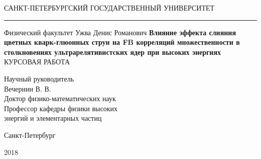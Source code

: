 \begin{titlepage} 
	\begin{center} 
		\large 
		САНКТ-ПЕТЕРБУРГСКИЙ ГОСУДАРСТВЕННЫЙ УНИВЕРСИТЕТ 
		\hrule \vspace {10pt} 
		\vskip 0.5cm 
		Физический факультет 
		\vskip 0.5cm 
		Ужва Денис Романович
		\vfill 
		{\LARGE \textbf{Влияние эффекта слияния цветных кварк-глюонных струн на FB корреляций множественности в столкновениях  ультрарелятивистских ядер при высоких энергиях}} \\		\bigskip 
		\textsc{КУРСОВАЯ РАБОТА }\\[5mm] 
		\end{center} 
	\vfill 
	\begin{flushright} 
		Научный руководитель \\ 
		Вечернин В. В.\\ 
		Доктор физико-математических наук\\ 
		Профессор кафедры физики высоких \\ 
		энергий и элементарных частиц 
	\end{flushright} 
	\vfill 
	\begin{center} 
		Санкт-Петербург 
	\end{center} 
	\begin{center} 
		2018
	\end{center} 
\end{titlepage} 